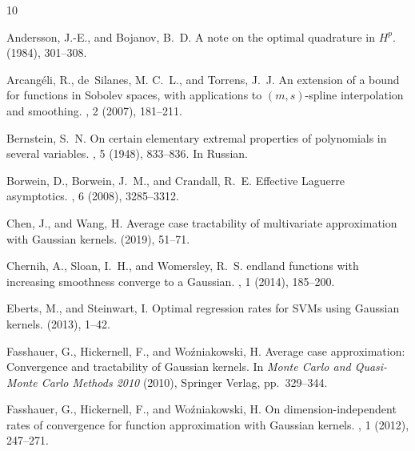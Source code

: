 \documentclass{mcom-l}
\numberwithin{equation}{section}
\numberwithin{theorem}{section} %
\begin{document}
\begin{thebibliography}{10}

{\sc Andersson, J.-E., and Bojanov, B.~D.}
\newblock A note on the optimal quadrature in {$H^p$}.
 (1984), 301--308.

{\sc Arcang{\'e}li, R., de~Silanes, M. C.~L., and Torrens, J.~J.}
\newblock An extension of a bound for functions in {S}obolev spaces, with
  applications to $(m,s)$-spline interpolation and smoothing.
, 2 (2007), 181--211.

{\sc Bernstein, S.~N.}
\newblock On certain elementary extremal properties of polynomials in several
  variables.
, 5 (1948), 833--836.
\newblock In Russian.

{\sc Borwein, D., Borwein, J.~M., and Crandall, R.~E.}
\newblock Effective {L}aguerre asymptotics.
, 6 (2008), 3285--3312.

{\sc Chen, J., and Wang, H.}
\newblock Average case tractability of multivariate approximation with
  {G}aussian kernels.
 (2019), 51--71.

{\sc Chernih, A., Sloan, I.~H., and Womersley, R.~S.}
endland functions with increasing smoothness converge to a
  {G}aussian.
, 1 (2014), 185--200.

{\sc Eberts, M., and Steinwart, I.}
\newblock Optimal regression rates for {SVM}s using {G}aussian kernels.
 (2013), 1--42.

{\sc Fasshauer, G., Hickernell, F., and Wo{\'z}niakowski, H.}
\newblock Average case approximation: Convergence and tractability of
  {G}aussian kernels.
\newblock In {\em Monte Carlo and Quasi-Monte Carlo Methods 2010\/} (2010),
  Springer Verlag, pp.~329--344.

{\sc Fasshauer, G., Hickernell, F., and Wo{\'z}niakowski, H.}
\newblock On dimension-independent rates of convergence for function
  approximation with {G}aussian kernels.
, 1 (2012), 247--271.


\end{thebibliography}
\end{document}
